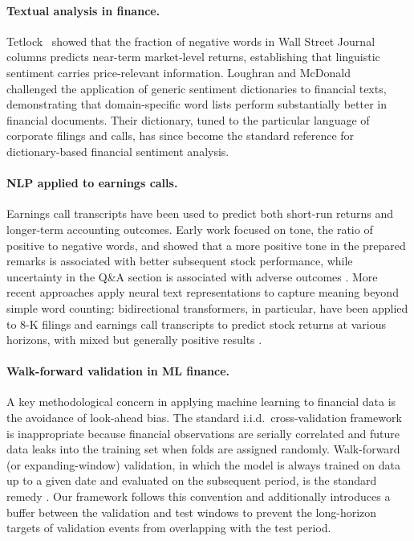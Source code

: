 \documentclass{article}
\begin{document}
\paragraph{Textual analysis in finance.}
Tetlock~\cite{tetlock2007} showed that the fraction of negative words in Wall Street Journal columns predicts near-term market-level returns, establishing that linguistic sentiment carries price-relevant information. Loughran and McDonald~\cite{lm2011} challenged the application of generic sentiment dictionaries to financial texts, demonstrating that domain-specific word lists perform substantially better in financial documents. Their dictionary, tuned to the particular language of corporate filings and calls, has since become the standard reference for dictionary-based financial sentiment analysis.

\paragraph{NLP applied to earnings calls.}
Earnings call transcripts have been used to predict both short-run returns and longer-term accounting outcomes. Early work focused on tone, the ratio of positive to negative words, and showed that a more positive tone in the prepared remarks is associated with better subsequent stock performance, while uncertainty in the Q\&A section is associated with adverse outcomes \cite{kearney2014}. More recent approaches apply neural text representations to capture meaning beyond simple word counting: bidirectional transformers, in particular, have been applied to 8-K filings and earnings call transcripts to predict stock returns at various horizons, with mixed but generally positive results \cite{yang2020finbert}.

\paragraph{Walk-forward validation in ML finance.}
A key methodological concern in applying machine learning to financial data is the avoidance of look-ahead bias. The standard i.i.d.\ cross-validation framework is inappropriate because financial observations are serially correlated and future data leaks into the training set when folds are assigned randomly. Walk-forward (or expanding-window) validation, in which the model is always trained on data up to a given date and evaluated on the subsequent period, is the standard remedy \cite{lopez2018}. Our framework follows this convention and additionally introduces a buffer between the validation and test windows to prevent the long-horizon targets of validation events from overlapping with the test period.
\end{document}

